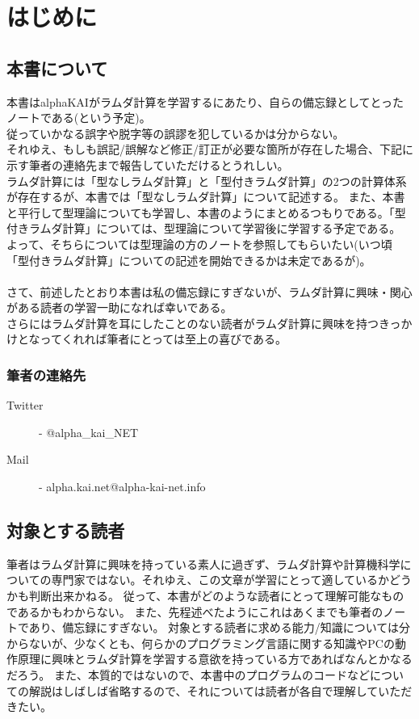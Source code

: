 \chapter{はじめに}{
	\section{本書について}{
		本書はalphaKAIがラムダ計算を学習するにあたり、自らの備忘録としてとったノートである(という予定)。 \\
		従っていかなる誤字や脱字等の誤謬を犯しているかは分からない。 \\
		それゆえ、もしも誤記/誤解など修正/訂正が必要な箇所が存在した場合、下記に示す筆者の連絡先まで報告していただけるとうれしい。 \\
		ラムダ計算には「型なしラムダ計算」と「型付きラムダ計算」の2つの計算体系が存在するが、本書では「型なしラムダ計算」について記述する。
		また、本書と平行して型理論についても学習し、本書のようにまとめるつもりである。「型付きラムダ計算」については、型理論について学習後に学習する予定である。
		よって、そちらについては型理論の方のノートを参照してもらいたい(いつ頃「型付きラムダ計算」についての記述を開始できるかは未定であるが)。\\
		\\
		さて、前述したとおり本書は私の備忘録にすぎないが、ラムダ計算に興味・関心がある読者の学習一助になれば幸いである。\\
		さらにはラムダ計算を耳にしたことのない読者がラムダ計算に興味を持つきっかけとなってくれれば筆者にとっては至上の喜びである。

		\subsection{筆者の連絡先}{
			\begin{description}
				\item[Twitter] - @alpha\_kai\_NET
				\item[Mail] - alpha.kai.net@alpha-kai-net.info
			\end{description}
		}
	}
	
	\section{対象とする読者}{
		筆者はラムダ計算に興味を持っている素人に過ぎず、ラムダ計算や計算機科学についての専門家ではない。それゆえ、この文章が学習にとって適しているかどうかも判断出来かねる。
		従って、本書がどのような読者にとって理解可能なものであるかもわからない。
		また、先程述べたようにこれはあくまでも筆者のノートであり、備忘録にすぎない。
		対象とする読者に求める能力/知識については分からないが、少なくとも、何らかのプログラミング言語に関する知識やPCの動作原理に興味とラムダ計算を学習する意欲を持っている方であればなんとかなるだろう。
		また、本質的ではないので、本書中のプログラムのコードなどについての解説はしばしば省略するので、それについては読者が各自で理解していただきたい。
	}
	
}
